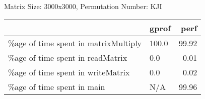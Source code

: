 \documentclass{article}
\begin{document}
    Matrix Size: 3000x3000, Permutation Number: KJI \\
    \begin{tabular}{llr}
\hline
                                      & gprof   &   perf \\
\hline
 \%age of time spent in matrixMultiply & 100.0   &  99.92 \\
 \%age of time spent in readMatrix     & 0.0     &   0.01 \\
 \%age of time spent in writeMatrix    & 0.0     &   0.02 \\
 \%age of time spent in main           & N/A     &  99.96 \\
\hline
\end{tabular}
    
\end{document}
